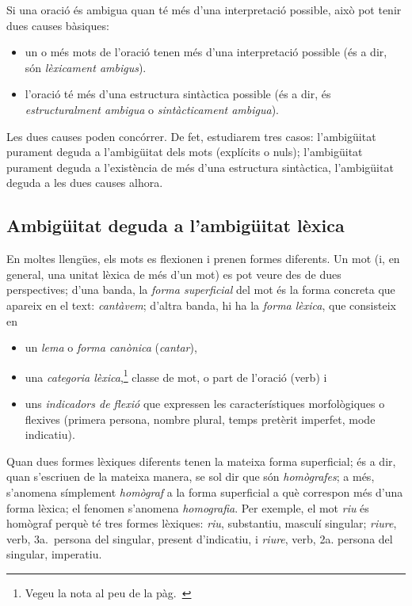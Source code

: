 Si una oració és ambigua quan té més d'una interpretació possible, això
pot tenir dues causes bàsiques:
\begin{itemize}
\item un o més mots de l'oració tenen més d'una interpretació possible
  (és a dir, són \emph{lèxicament ambigus}).
\item l'oració té més d'una estructura sintàctica possible (és a dir,
  és \emph{estructuralment ambigua} o \emph{sintàcticament ambigua}).
\end{itemize}
Les dues causes poden concórrer. De fet, estudiarem tres casos:
l'ambigüitat purament deguda a l'ambigüitat dels mots (explícits o
nuls); l'ambigüitat purament deguda a l'existència de més d'una
estructura sintàctica, l'ambigüitat deguda a les dues causes alhora.




\subsection{Ambigüitat  deguda a l'ambigüitat lèxica}
\label{ss:amblex}


En moltes llengües, els mots es flexionen i prenen formes diferents.
Un mot (i, en general, una unitat lèxica de més d'un mot) es pot veure
des de dues perspectives; d'una banda, la \emph{forma superficial}
del mot és la forma concreta que apareix en el text: \emph{cantàvem};
d'altra banda, hi ha la \emph{forma lèxica}, que consisteix en
\begin{itemize}
\item un \emph{lema} o \emph{forma canònica} (\emph{cantar}), 
\item una \emph{categoria lèxica},\label{pg:catlex}\footnote{Vegeu la nota al peu  de la pàg.~\pageref{pg:catgra}} classe de mot, o part de l'oració
  (verb) i 
\item uns \emph{indicadors de flexió} que expressen les característiques
morfològiques o flexives (primera persona, nombre plural, temps
pretèrit imperfet, mode indicatiu). 
\end{itemize}
Quan dues formes lèxiques diferents tenen la mateixa forma
superficial; és a dir, quan s'escriuen de la mateixa manera, se sol dir que
són \emph{homògrafes}\label{pg:homografia}; a més, s'anomena símplement \emph{homògraf} a
la forma superficial a què correspon més d'una forma lèxica; el
fenomen s'anomena \emph{homografia}. Per exemple, el mot \emph{riu} és
homògraf perquè té tres formes lèxiques: \emph{riu}, substantiu,
masculí singular; \emph{riure}, verb, 3a.\ persona del singular,
present d'indicatiu, i \emph{riure}, verb, 2a. persona del singular,
imperatiu.


